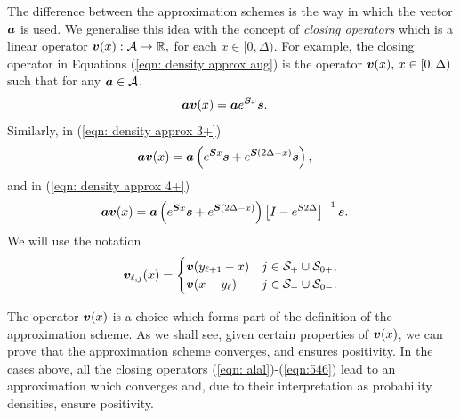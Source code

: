 The difference between the approximation schemes is the way in which the vector \(\boldsymbol a\) is used. We generalise this idea with the concept of \emph{closing operators} which is a linear operator \({\boldsymbol v}(x):\mathcal A \to \mathbb R,\) for each \(x\in{}[0,\Delta)\). For example, the closing operator in Equations (\ref{eqn: density approx aug}) is the operator \({\boldsymbol v}(x),\,x\in{}[0,\Delta)\) such that for any \(\boldsymbol a \in{}\mathcal A\), 
\begin{align}
	\boldsymbol a {\boldsymbol v}(x) &= \boldsymbol a e^{\boldsymbol Sx}\boldsymbol s.\label{eqn: alal}
\end{align}
Similarly, in (\ref{eqn: density approx 3+})
\begin{align}
	\boldsymbol a {\boldsymbol v}(x) &= \boldsymbol a \left(e^{ \boldsymbol{S}x} \boldsymbol s + e^{ \boldsymbol{S}(2\Delta-x)} \boldsymbol s\right),\label{eqn:546}
\end{align}
and in (\ref{eqn: density approx 4+})
\begin{align}
	\boldsymbol a {\boldsymbol v}(x) &= \boldsymbol a \left(e^{ \boldsymbol{S}x} \boldsymbol s + e^{ \boldsymbol{S}(2\Delta-x)}\right)\left[I-e^{S2\Delta}\right]^{-1} \boldsymbol s.\label{eqn:5462}
\end{align}
We will use the notation 
\begin{align}
	\boldsymbol v_{\ell,j}(x) = \begin{cases} \boldsymbol v(y_{\ell+1}-x) & j\in\mathcal{S}_+\cup\mathcal{S}_{0+}, \\ \boldsymbol v(x-y_\ell) & j\in\mathcal{S}_-\cup\mathcal{S}_{0-}. \end{cases}
\end{align}

The operator \({\boldsymbol v}(x)\) is a choice which forms part of the definition of the approximation scheme. As we shall see, given certain properties of \({\boldsymbol v}(x)\), we can prove that the approximation scheme converges, and ensures positivity. In the cases above, all the closing operators (\ref{eqn: alal})-(\ref{eqn:546}) lead to an approximation which converges and, due to their interpretation as probability densities, ensure positivity. 


